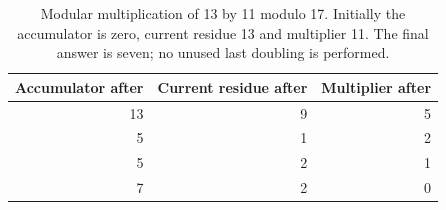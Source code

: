 \begin{table}[!ht]
  \centering
  \begin{tabular}{r r r}
    \toprule
    Accumulator after & Current residue after & Multiplier after \\
    \midrule
    13                & 9                     & 5                \\
    5                 & 1                     & 2                \\
    5                 & 2                     & 1                \\
    7                 & 2                     & 0                \\
    \bottomrule
  \end{tabular}
  \caption{Modular multiplication of 13 by 11 modulo 17. Initially the accumulator is zero, current residue 13 and multiplier 11. The final answer is seven; no unused last doubling is performed.}
  \label{tab:revision-rsa-modproduct}
\end{table}
